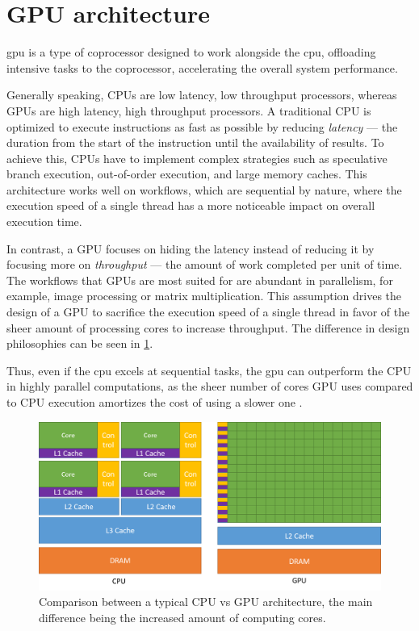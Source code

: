 \section {GPU architecture}

\acrfull{gpu} is a type of coprocessor designed to work alongside the \acrshort{cpu}, offloading intensive tasks to the coprocessor, accelerating the overall system performance.

Generally speaking, CPUs are low latency, low throughput processors, whereas GPUs are high latency, high throughput processors. A traditional CPU is optimized to execute instructions as fast as possible by reducing \textit{latency} --- the duration from the start of the instruction until the availability of results. To achieve this, CPUs have to implement complex strategies such as speculative branch execution, out-of-order execution, and large memory caches. This architecture works well on workflows, which are sequential by nature, where the execution speed of a single thread has a more noticeable impact on overall execution time.

In contrast, a GPU focuses on hiding the latency instead of reducing it by focusing more on \textit{throughput} --- the amount of work completed per unit of time. The workflows that GPUs are most suited for are abundant in parallelism, for example, image processing or matrix multiplication. This assumption drives the design of a GPU to sacrifice the execution speed of a single thread in favor of the sheer amount of processing cores to increase throughput. The difference in design philosophies can be seen in \cref{figure:cpu-vs-gpu}.

Thus, even if the \acrshort{cpu} excels at sequential tasks, the \acrshort{gpu} can outperform the CPU in highly parallel computations, as the sheer number of cores GPU uses compared to CPU execution amortizes the cost of using a slower one \cite{cudaprog}.

\begin{figure}
  \centering
  \includegraphics[width=\textwidth]{components/figure/cpu-vs-gpu.png}
  \caption[Comparison between a typical CPU vs GPU architecture]{Comparison between a typical CPU vs GPU architecture, the main difference being the increased amount of computing cores. \cite{cudaprog}}
  \label{figure:cpu-vs-gpu}
\end{figure}

